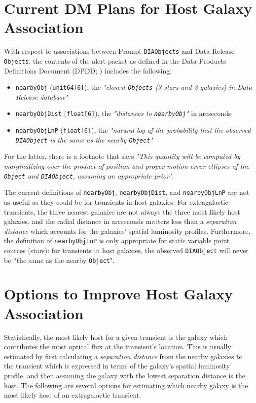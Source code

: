 \documentclass[DM,authoryear,toc]{lsstdoc}
\begin{document}
\section{Current DM Plans for Host Galaxy Association}\label{sec:DMplans}

With respect to associations between Prompt {\tt DIAObjects} and Data Release {\tt Objects}, the contents of the alert packet as defined in the Data Products Definitions Document (DPDD; ) includes the following:
\begin{itemize}
\item {\tt nearbyObj} ({\tt unit64[6]}), the {\it "closest {\tt Objects} (3 stars and 3 galaxies) in Data Release database"}
\item {\tt nearbyObjDist} ({\tt float[6]}), the {\it "distances to {\tt nearbyObj}"} in arcseconds
\item {\tt nearbyObjLnP} ({\tt float[6]}), the {\it "natural log of the probability that the observed {\tt DIAObject} is the same as the nearby {\tt Object}"}
\end{itemize}
For the latter, there is a footnote that says {\it "This quantity will be computed by marginalizing over the product of position and proper motion error ellipses of the {\tt Object} and {\tt DIAObject}, assuming an appropriate prior"}.

The current definitions of {\tt nearbyObj}, {\tt nearbyObjDist}, and {\tt nearbyObjLnP} are not as useful as they could be for transients in host galaxies. 
For extragalactic transients, the three nearest galaxies are not always the three most likely host galaxies, and the radial distance in arcseconds matters less than a \emph{separation distance} which accounts for the galaxies' spatial luminosity profiles.
Furthermore, the definition of {\tt nearbyObjLnP} is only appropriate for static variable point sources (stars): for transients in host galaxies, the observed {\tt DIAObject} will never be ``the same as the nearby {\tt Object}".


\section{Options to Improve Host Galaxy Association}\label{sec:options}

Statistically, the most likely host for a given transient is the galaxy which contributes the most optical flux at the transient's location.
This is usually estimated by first calculating a \emph{separation distance} from the nearby galaxies to the transient which is expressed in terms of the galaxy's spatial luminosity profile, and then assuming the galaxy with the lowest separation distance is the host.
The following are several options for estimating which nearby galaxy is the most likely host of an extragalactic transient.
\end{document}
